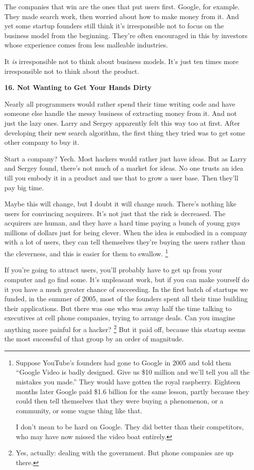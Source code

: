 The companies that win are the ones that put users first. Google, for
example. They made search work, then worried about how to make money
from it. And yet some startup founders still think it's irresponsible
not to focus on the business model from the beginning. They're often
encouraged in this by investors whose experience comes from less
malleable industries.

It \emph{is} irresponsible not to think about business models. It's just
ten times more irresponsible not to think about the product.

\textbf{16. Not Wanting to Get Your Hands Dirty}

Nearly all programmers would rather spend their time writing code and
have someone else handle the messy business of extracting money from it.
And not just the lazy ones. Larry and Sergey apparently felt this way
too at first. After developing their new search algorithm, the first
thing they tried was to get some other company to buy it.

Start a company? Yech. Most hackers would rather just have ideas. But as
Larry and Sergey found, there's not much of a market for ideas. No one
trusts an idea till you embody it in a product and use that to grow a
user base. Then they'll pay big time.

Maybe this will change, but I doubt it will change much. There's nothing
like users for convincing acquirers. It's not just that the risk is
decreased. The acquirers are human, and they have a hard time paying a
bunch of young guys millions of dollars just for being clever. When the
idea is embodied in a company with a lot of users, they can tell
themselves they're buying the users rather than the cleverness, and this
is easier for them to swallow. \footnote{Suppose YouTube's founders had gone to Google in 2005 and told
them ``Google Video is badly designed. Give us \$10 million and we'll
tell you all the mistakes you made.'' They would have gotten the royal
raspberry. Eighteen months later Google paid \$1.6 billion for the same
lesson, partly because they could then tell themselves that they were
buying a phenomenon, or a community, or some vague thing like that.

I don't mean to be hard on Google. They did better than their
competitors, who may have now missed the video boat entirely.}

If you're going to attract users, you'll probably have to get up from
your computer and go find some. It's unpleasant work, but if you can
make yourself do it you have a much greater chance of succeeding. In the
first batch of startups we funded, in the summer of 2005, most of the
founders spent all their time building their applications. But there was
one who was away half the time talking to executives at cell phone
companies, trying to arrange deals. Can you imagine anything more
painful for a hacker? \footnote{Yes, actually: dealing with the government. But phone companies
are up there.} But it paid off, because
this startup seems the most successful of that group by an order of
magnitude.

